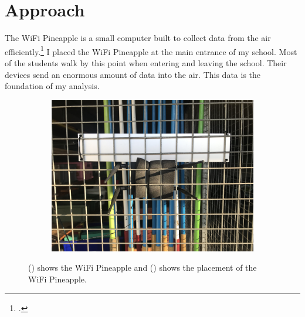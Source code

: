 \documentclass[paper=a4, fontsize=11pt]{article}
\begin{document}
\section{Approach}
The WiFi Pineapple is a small computer built to collect data from the air efficiently.\footcite{wifipineapple}
I placed the WiFi Pineapple at the main entrance of my school. Most of the students walk by this point when entering and leaving the school. Their devices send an enormous amount of data into the air. This data is the foundation of my analysis.

\begin{figure}[ht]
\centering
\begin{subfigure}[b]{0.45\linewidth}
\centering\includegraphics[width = 0.9\linewidth]{images/WIFIpineappleinside2.jpg}
\caption{\label{fig:WIFI-pineapple}}
\end{subfigure}
\begin{subfigure}[b]{0.45\linewidth}
\centering\caption{\label{fig:Hidden-WIFI-pineapple}}
\end{subfigure}
\caption{() shows the WiFi Pineapple and () shows the placement of the WiFi Pineapple.}
\end{figure}
\end{document}
